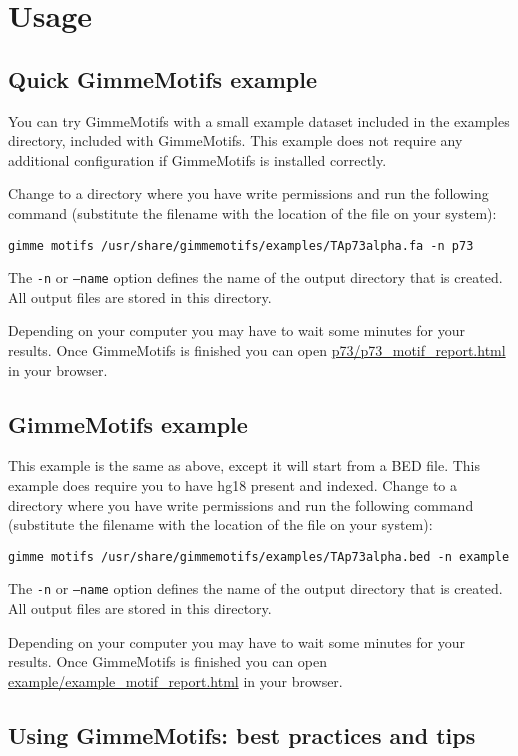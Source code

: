 \documentclass[11pt]{article}
\begin{document}
\section{Usage}
\subsection{Quick GimmeMotifs example}
\label{sec:quick_example}
You can try GimmeMotifs with a small example dataset included in the examples directory, included with GimmeMotifs. This example does not require any additional configuration if GimmeMotifs is installed correctly.

Change to a directory where you have write permissions and run the following command (substitute the filename with the location of the file on your system):
\begin{verbatim}
gimme motifs /usr/share/gimmemotifs/examples/TAp73alpha.fa -n p73
\end{verbatim}

The \texttt{-n} or \texttt{--name} option defines the name of the output directory that is created. All output files are stored in this directory.

Depending on your computer you may have to wait some minutes for your results. Once GimmeMotifs is finished you can open \url{p73/p73_motif_report.html} in your browser. 

\subsection{GimmeMotifs example}
This example is the same as above, except it will start from a BED file. This example does require you to have hg18 present and indexed. 
Change to a directory where you have write permissions and run the following command (substitute the filename with the location of the file on your system):
\begin{verbatim}
gimme motifs /usr/share/gimmemotifs/examples/TAp73alpha.bed -n example
\end{verbatim}

The \texttt{-n} or \texttt{--name} option defines the name of the output directory that is created. All output files are stored in this directory.

Depending on your computer you may have to wait some minutes for your results. Once GimmeMotifs is finished you can open \url{example/example_motif_report.html} in your browser. 

\subsection{Using GimmeMotifs: best practices and tips}
\end{document}
